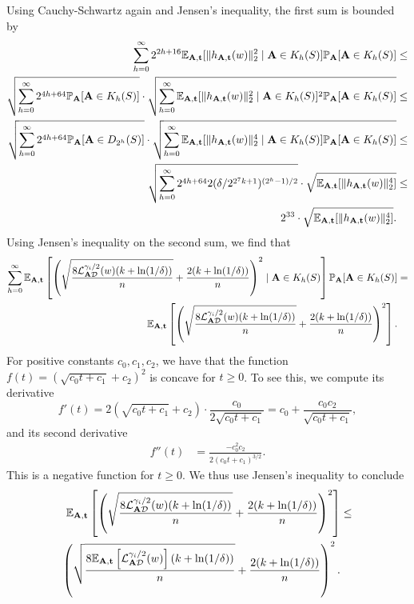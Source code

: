Using Cauchy-Schwartz again and Jensen's inequality, the first sum is bounded by
\begin{align*}
\sum_{h=0}^\infty 2^{2h+16} \mathbb{E}_{\mathbf{A},\mathbf{t}}[\|h_{\mathbf{A},\mathbf{t}}(w)\|^2_2 \mid \mathbf{A} \in K_h(S) ] \mathbb{P}_{\mathbf{A}}[\mathbf{A} \in K_h(S)] &\leq \\
\sqrt{ \sum_{h=0}^\infty 2^{4h + 64}\mathbb{P}_{\mathbf{A}}[\mathbf{A} \in K_h(S)] } \cdot \sqrt{\sum_{h=0}^\infty \mathbb{E}_{\mathbf{A},\mathbf{t}}[\|h_{\mathbf{A},\mathbf{t}}(w)\|^2_2 \mid \mathbf{A} \in K_h(S) ]^2 \mathbb{P}_{\mathbf{A}}[\mathbf{A} \in K_h(S)] } &\leq \\
\sqrt{ \sum_{h=0}^\infty 2^{4h + 64}\mathbb{P}_{\mathbf{A}}[\mathbf{A} \in D_{2^h}(S)] } \cdot \sqrt{\sum_{h=0}^\infty \mathbb{E}_{\mathbf{A},\mathbf{t}}[\|h_{\mathbf{A},\mathbf{t}}(w)\|^4_2 \mid \mathbf{A} \in K_h(S) ] \mathbb{P}_{\mathbf{A}}[\mathbf{A} \in K_h(S)] } &\leq \\
\sqrt{ \sum_{h=0}^\infty 2^{4h + 64} 2 (\delta/2^{2^7k+1})^{(2^h-1)/2} } \cdot \sqrt{\mathbb{E}_{\mathbf{A},\mathbf{t}}[\|h_{\mathbf{A},\mathbf{t}}(w)\|^4_2 ] } &\leq \\
2^{33} \cdot \sqrt{\mathbb{E}_{\mathbf{A},\mathbf{t}}[\|h_{\mathbf{A},\mathbf{t}}(w)\|^4_2 ] }.
\end{align*}
Using Jensen's inequality on the second sum, we find that
\begin{align*}
\sum_{h=0}^\infty \mathbb{E}_{\mathbf{A},\mathbf{t}}\left[ \left(\sqrt{\frac{8\mathcal{L}_{\mathbf{A} \mathcal{D}}^{\gamma_i/2}(w)(k + \ln(1/\delta))}{n}} + \frac{2 (k + \ln(1/\delta))}{n} \right)^2\mid \mathbf{A} \in K_h(S)\right]\mathbb{P}_{\mathbf{A}}[\mathbf{A} \in K_h(S)] &=\\
\mathbb{E}_{\mathbf{A},\mathbf{t}}\left[ \left(\sqrt{\frac{8\mathcal{L}_{\mathbf{A} \mathcal{D}}^{\gamma_i/2}(w)(k + \ln(1/\delta))}{n}} + \frac{2 (k + \ln(1/\delta))}{n} \right)^2\right].
\end{align*}
For positive constants $c_0,c_1,c_2$, we have that the function $f(t)=(\sqrt{c_0 t + c_1} + c_2)^2$ is concave for $t \geq 0$. To see this, we compute its derivative 
\[
f'(t) = 2(\sqrt{c_0 t + c_1} + c_2) \cdot \frac{c_0}{2\sqrt{c_0 t + c_1}} = c_0 + \frac{c_0 c_2}{\sqrt{c_0 t + c_1}},
\]
and its second derivative
\begin{align*}
f''(t) &= \frac{-c_0^2 c_2}{2 (c_0 t + c_1)^{3/2}}.
\end{align*}
This is a negative function for $t \geq 0$. We thus use Jensen's inequality to conclude
\begin{align*}
\mathbb{E}_{\mathbf{A},\mathbf{t}}\left[ \left(\sqrt{\frac{8\mathcal{L}_{\mathbf{A} \mathcal{D}}^{\gamma_i/2}(w)(k + \ln(1/\delta))}{n}} + \frac{2 (k + \ln(1/\delta))}{n} \right)^2\right] &\leq \\
 \left(\sqrt{\frac{8\mathbb{E}_{\mathbf{A},\mathbf{t}}\left[\mathcal{L}_{\mathbf{A} \mathcal{D}}^{\gamma_i/2}(w)\right] (k + \ln(1/\delta))}{n}} + \frac{2 (k + \ln(1/\delta))}{n} \right)^2.
\end{align*}

